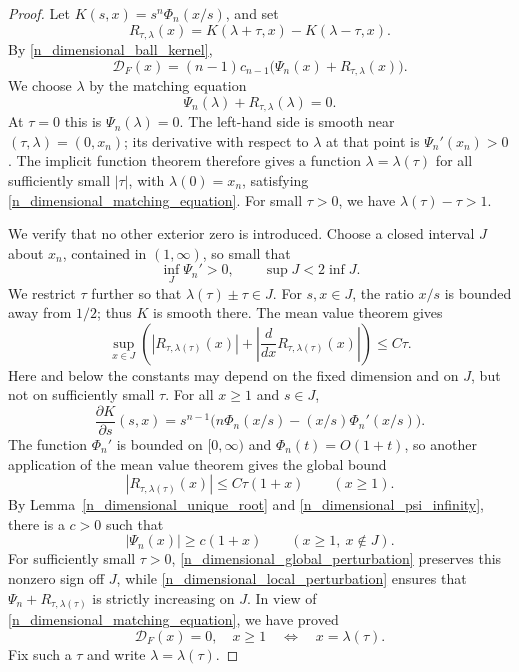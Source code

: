 \documentclass[12pt]{amsart}
\numberwithin{equation}{section}
\begin{document}
\begin{proof}
Let $K(s,x)=s^n\Phi_n(x/s)$, and set
\[
R_{\tau,\lambda}(x)=K(\lambda+\tau,x)-K(\lambda-\tau,x).
\]
By \eqref{n_dimensional_ball_kernel},
\begin{equation}
\label{n_dimensional_shell_derivative}
\mathcal D_F(x)=(n-1)c_{n-1}
                \bigl(\Psi_n(x)+R_{\tau,\lambda}(x)\bigr).
\end{equation}
We choose $\lambda$ by the matching equation
\begin{equation}
\label{n_dimensional_matching_equation}
\Psi_n(\lambda)+R_{\tau,\lambda}(\lambda)=0.
\end{equation}
At $\tau=0$ this is $\Psi_n(\lambda)=0$.
The left-hand side is smooth near $(\tau,\lambda)=(0,x_n)$;
its derivative with respect to $\lambda$ at that point is
$\Psi_n'(x_n)>0$. The implicit function theorem therefore gives
a function $\lambda=\lambda(\tau)$ for all sufficiently small
$|\tau|$, with $\lambda(0)=x_n$, satisfying
\eqref{n_dimensional_matching_equation}. For small $\tau>0$,
we have $\lambda(\tau)-\tau>1$.

We verify that no other exterior zero is introduced. Choose a closed
interval $J$ about $x_n$, contained in $(1,\infty)$, so small that
\[
\inf_J\Psi_n'>0,
\qquad \sup J<2\inf J.
\]
We restrict $\tau$ further so that $\lambda(\tau)\pm\tau\in J$.
For $s,x\in J$, the ratio $x/s$ is bounded away from $1/2$;
thus $K$ is smooth there. The mean value theorem gives
\begin{equation}
\label{n_dimensional_local_perturbation}
\sup_{x\in J}\left(
 |R_{\tau,\lambda(\tau)}(x)|
 +\left|\frac{d}{dx}R_{\tau,\lambda(\tau)}(x)\right|
 \right)\leq C\tau.
\end{equation}
Here and below the constants may depend on the fixed dimension and
on $J$, but not on sufficiently small $\tau$.
For all $x\geq1$ and $s\in J$,
\[
\frac{\partial K}{\partial s}(s,x)
 =s^{n-1}\bigl(n\Phi_n(x/s)-(x/s)\Phi_n'(x/s)\bigr).
\]
The function $\Phi_n'$ is bounded on $[0,\infty)$ and
$\Phi_n(t)=O(1+t)$, so another application of the mean value theorem
gives the global bound
\begin{equation}
\label{n_dimensional_global_perturbation}
|R_{\tau,\lambda(\tau)}(x)|\leq C\tau(1+x)
                    \qquad(x\geq1).
\end{equation}
By Lemma~\ref{n_dimensional_unique_root} and
\eqref{n_dimensional_psi_infinity}, there is a $c>0$ such that
\[
|\Psi_n(x)|\geq c(1+x)\qquad(x\geq1,\ x\notin J).
\]
For sufficiently small $\tau>0$,
\eqref{n_dimensional_global_perturbation} preserves this nonzero
sign off $J$, while \eqref{n_dimensional_local_perturbation}
ensures that $\Psi_n+R_{\tau,\lambda(\tau)}$ is strictly increasing
on $J$. In view of \eqref{n_dimensional_matching_equation}, we have
proved
\begin{equation}
\label{n_dimensional_only_exterior_zero}
\mathcal D_F(x)=0,\quad x\geq1
       \quad\Longleftrightarrow\quad x=\lambda(\tau).
\end{equation}
Fix such a $\tau$ and write $\lambda=\lambda(\tau)$.


\end{proof}
\end{document}
